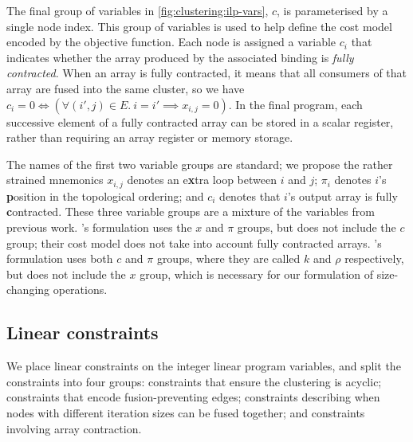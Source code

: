 
The final group of variables in \cref{fig:clustering:ilp-vars}, $c$, is parameterised by a single node index.
This group of variables is used to help define the cost model encoded by the objective function.
Each node is assigned a variable $c_i$ that indicates whether the array produced by the associated binding is \emph{fully contracted}.
When an array is fully contracted, it means that all consumers of that array are fused into the same cluster, so we have $c_i = 0 \iff (\forall (i',j) \in E.\ i = i' \implies x_{i,j} = 0)$.
In the final program, each successive element of a fully contracted array can be stored in a scalar register, rather than requiring an array register or memory storage. 

The names of the first two variable groups are standard; we propose the rather strained mnemonics $x_{i,j}$ denotes an e{\bf x}tra loop between $i$ and $j$; $\pi_i$ denotes $i$'s {\bf p}osition in the topological ordering; and $c_i$ denotes that $i$'s output array is fully {\bf c}ontracted.
These three variable groups are a mixture of the variables from previous work.
\citet{megiddo1998optimal}'s formulation uses the $x$ and $\pi$ groups, but does not include the $c$ group; their cost model does not take into account fully contracted arrays.
\citet{darte2002contraction}'s formulation uses both $c$ and $\pi$ groups, where they are called $k$ and $\rho$ respectively, but does not include the $x$ group, which is necessary for our formulation of size-changing operations.


\subsection{Linear constraints}
\label{clustering:s:LinearConstraints}
We place linear constraints on the integer linear program variables, and split the constraints into four groups: constraints that ensure the clustering is acyclic; constraints that encode fusion-preventing edges; constraints describing when nodes with different iteration sizes can be fused together; and constraints involving array contraction. 

